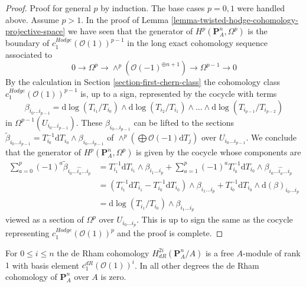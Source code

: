 \begin{proof}
\medskip\noindent
Proof for general $p$ by induction. The base cases $p = 0, 1$ were handled
above. Assume $p > 1$. In the proof of
Lemma \ref{lemma-twisted-hodge-cohomology-projective-space}
we have seen that the generator of $H^p(\mathbf{P}^n_A, \Omega^p)$
is the boundary of $c_1^{Hodge}(\mathcal{O}(1))^{p - 1}$
in the long exact cohomology sequence associated to
$$
0 \to \Omega^p \to \wedge^p\left(\mathcal{O}(-1)^{\oplus n + 1}\right)
\to \Omega^{p - 1} \to 0
$$
By the calculation in Section \ref{section-first-chern-class}
the cohomology class $c_1^{Hodge}(\mathcal{O}(1))^{p - 1}$
is, up to a sign, represented by the cocycle with terms
$$
\beta_{i_0 \ldots i_{p - 1}} =
\text{d}\log(T_{i_1}/T_{i_0}) \wedge
\text{d}\log(T_{i_2}/T_{i_1}) \wedge \ldots \wedge
\text{d}\log(T_{i_{p - 1}}/T_{i_{p - 2}})
$$
in $\Omega^{p - 1}(U_{i_0 \ldots i_{p - 1}})$. These
$\beta_{i_0 \ldots i_{p - 1}}$ can be lifted to the sections
$\tilde \beta_{i_0 \ldots i_{p -1}} =
T_{i_0}^{-1}\text{d}T_{i_0} \wedge \beta_{i_0 \ldots i_{p - 1}}$
of $\wedge^p(\bigoplus \mathcal{O}(-1) \text{d}T_j)$ over
$U_{i_0 \ldots i_{p - 1}}$. We conclude that the generator of
$H^p(\mathbf{P}^n_A, \Omega^p)$ is given by the cocycle whose
components are
\begin{align*}
\sum\nolimits_{a = 0}^p (-1)^a
\tilde \beta_{i_0 \ldots \hat{i_a} \ldots i_p}
& =
T_{i_1}^{-1}\text{d}T_{i_1} \wedge \beta_{i_1 \ldots i_p}
+ \sum\nolimits_{a = 1}^p (-1)^a
T_{i_0}^{-1}\text{d}T_{i_0} \wedge
\beta_{i_0 \ldots \hat{i_a} \ldots i_p} \\
& =
(T_{i_1}^{-1}\text{d}T_{i_1} - T_{i_0}^{-1}\text{d}T_{i_0}) \wedge
\beta_{i_1 \ldots i_p} +
T_{i_0}^{-1}\text{d}T_{i_0} \wedge \text{d}(\beta)_{i_0 \ldots i_p} \\
& =
\text{d}\log(T_{i_1}/T_{i_0}) \wedge \beta_{i_1 \ldots i_p}
\end{align*}
viewed as a section of $\Omega^p$ over $U_{i_0 \ldots i_p}$.
This is up to sign the same as the cocycle representing
$c_1^{Hodge}(\mathcal{O}(1))^p$ and the proof is complete.
\end{proof}

\begin{lemma}
\label{lemma-de-rham-cohomology-projective-space}
For $0 \leq i \leq n$ the de Rham cohomology
$H^{2i}_{dR}(\mathbf{P}^n_A/A)$ is a free $A$-module of rank $1$
with basis element $c_1^{dR}(\mathcal{O}(1))^i$.
In all other degrees the de Rham cohomology of $\mathbf{P}^n_A$
over $A$ is zero.
\end{lemma}

